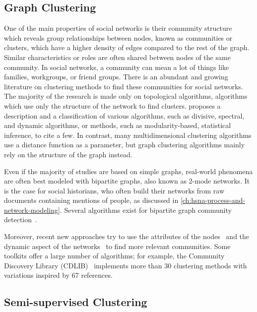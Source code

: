 \subsection{Graph Clustering}

One of the main properties of social networks is their community structure~\cite{girvanCommunityStructureSocial2002} which reveals group relationships between nodes, known as communities or clusters, which have a higher density of edges compared to the rest of the graph. Similar characteristics or roles are often shared between nodes of the same community.
In social networks, a community can mean a lot of things like families, workgroups, or friend groups. There is an abundant and growing literature on clustering methods to find these communities for social networks. The majority of the research is made only on topological algorithms, \ie algorithms which use only the structure of the network to find clusters. \cite{fortunatoCommunityDetectionGraphs2010} proposes a description and a classification of various algorithms, such as divisive, spectral, and dynamic algorithms, or methods, such as modularity-based, statistical inference, to cite a few.
In contrast, many multidimensional clustering algorithms use a distance function as a parameter, but graph clustering algorithms mainly rely on the structure of the graph instead.

Even if the majority of studies are based on simple graphs, real-world phenomena are often best modeled with bipartite graphs, also known as 2-mode networks. It is the case for social historians, who often build their networks from raw documents containing mentions of people, as discussed in \autoref{ch:hsna-process-and-network-modeling}. Several algorithms exist for bipartite graph community detection~\cite{alzahraniCommunityDetectionBipartite2016}.

Moreover, recent new approaches try to use the attributes of the nodes~\cite{yangCommunityDetectionNetworks2013} and the dynamic aspect of the networks~\cite{rossettiCommunityDiscoveryDynamic2018} to find more relevant communities. Some toolkits offer a large number of algorithms; for example, the Community Discovery Library (CDLIB)~\cite{rossettiCDLIBPythonLibrary2019} implements more than 30 clustering methods with variations inspired by 67 references.


\subsection{Semi-supervised Clustering}\label{sec:semisupervised}

